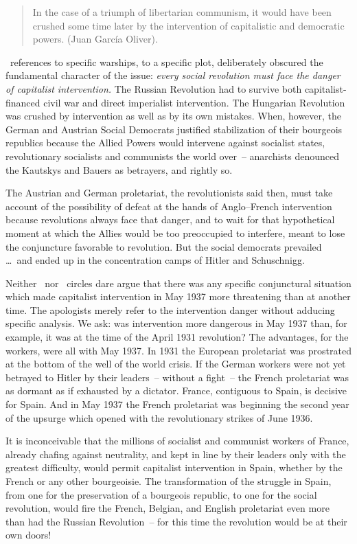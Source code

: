 \begin{quotation}
  \sloppy
  In the case of a triumph of libertarian communism, it would have been crushed some time later by the intervention of capitalistic and democratic powers. (Juan Garc\'ia Oliver).
\end{quotation}

\CNT\ references to specific warships, to a specific plot, deliberately obscured the fundamental character of the issue: \emph{every social revolution must face the danger of capitalist intervention.} The Russian Revolution had to survive both capitalist-financed civil war and direct imperialist intervention. The Hungarian Revolution was crushed by intervention as well as by its own mistakes. When, however, the German and Austrian Social Democrats justified stabilization of their bourgeois republics because the Allied Powers would intervene against socialist states, revolutionary socialists and communists the world over~-- anarchists denounced the Kautskys and Bauers as betrayers, and rightly so.

The Austrian and German proletariat, the revolutionists said then, must take account of the possibility of defeat at the hands of Anglo--French intervention because revolutions always face that danger, and to wait for that hypothetical moment at which the Allies would be too preoccupied to interfere, meant to lose the conjuncture favorable to revolution. But the social democrats prevailed \dots\ and ended up in the concentration camps of Hitler and Schuschnigg.

Neither \CNT\ nor \POUM\ circles dare argue that there was any specific conjunctural situation which made capitalist intervention in May 1937 more threatening than at another time. The apologists merely refer to the intervention danger without adducing specific analysis. We ask: was intervention more dangerous in May 1937 than, for example, it was at the time of the April 1931 revolution? The advantages, for the workers, were all with May 1937. In 1931 the European proletariat was prostrated at the bottom of the well of the world crisis. If the German workers were not yet betrayed to Hitler by their leaders~-- without a fight~-- the French proletariat was as dormant as if exhausted by a dictator. France, contiguous to Spain, is decisive for Spain. And in May 1937 the French proletariat was beginning the second year of the upsurge which opened with the revolutionary strikes of June 1936.

It is inconceivable that the millions of socialist and communist workers of France, already chafing against neutrality, and kept in line by their leaders only with the greatest difficulty, would permit capitalist intervention in Spain, whether by the French or any other bourgeoisie. The transformation of the struggle in Spain, from one for the preservation of a bourgeois republic, to one for the social revolution, would fire the French, Belgian, and English proletariat even more than had the Russian Revolution~-- for this time the revolution would be at their own doors!

